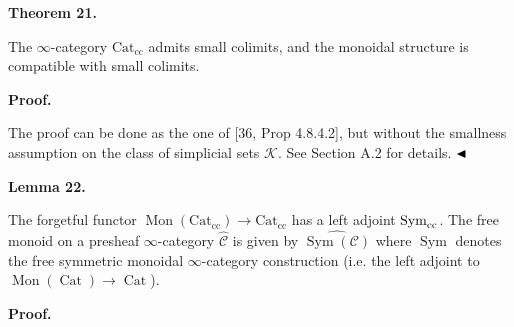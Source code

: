 
 
\par\medskip\noindent\textbf{Theorem 21.}\par
 
 
The $\infty$-category $\operatorname{Cat_{cc}}$ admits small colimits, and the monoidal structure is compatible with small colimits.\par
 
 
 
 
 
\par\medskip\noindent\textbf{Proof.}\par
 
 
The proof can be done as the one of [36, Prop 4.8.4.2], but without the smallness assumption on the class of simplicial sets ${\mathcal{K}}$. See Section A.2 for details. $\hfill\blacktriangleleft$\par
 
 
 
\par\medskip\noindent\textbf{Lemma 22.}\par
 
 
The forgetful functor $\operatorname{Mon}(\operatorname{Cat_{cc}})\to\operatorname{Cat_{cc}}$ has a left adjoint $\operatorname{Sym}_{\textnormal{cc}}$. The free monoid on a presheaf $\infty$-category $\widehat{{\mathcal{C}}}$ is given by $\widehat{\operatorname{Sym}({\mathcal{C}})}$ where $\operatorname{Sym}$ denotes the free symmetric monoidal $\infty$-category construction (i.e. the left adjoint to $\operatorname{Mon}(\operatorname{Cat})\to\operatorname{Cat}$).\par
 
 
 
 
 
\par\medskip\noindent\textbf{Proof.}\par
 
